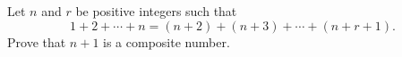 Let $n$ and $r$ be positive integers such that
\[1+2+\cdots+n=(n+2)+(n+3)+\cdots+(n+r+1).\]
Prove that $n+1$ is a composite number.
